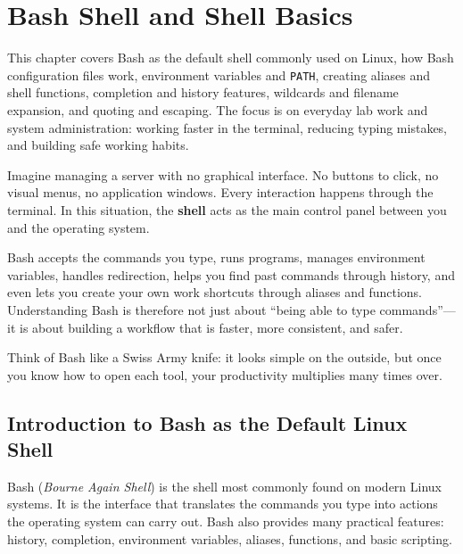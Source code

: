 
\chapter{Bash Shell and Shell Basics}
\label{ch:bash-shell-basic}

This chapter covers Bash as the default shell commonly used on Linux, how
Bash configuration files work, environment variables and \texttt{PATH},
creating aliases and shell functions, completion and history features,
wildcards and filename expansion, and quoting and escaping. The focus is on
everyday lab work and system administration: working faster in the terminal,
reducing typing mistakes, and building safe working habits.

\begin{examplebox}
Imagine managing a server with no graphical interface. No buttons to click,
no visual menus, no application windows. Every interaction happens through
the terminal. In this situation, the \textbf{shell} acts as the main control
panel between you and the operating system.

Bash accepts the commands you type, runs programs, manages environment
variables, handles redirection, helps you find past commands through history,
and even lets you create your own work shortcuts through aliases and
functions. Understanding Bash is therefore not just about ``being able to
type commands''---it is about building a workflow that is faster, more
consistent, and safer.

Think of Bash like a Swiss Army knife: it looks simple on the outside, but
once you know how to open each tool, your productivity multiplies many times
over.
\end{examplebox}

\section{Introduction to Bash as the Default Linux Shell}
\label{sec:bash-introduction}

Bash (\textit{Bourne Again Shell}) is the shell most commonly found on modern
Linux systems. It is the interface that translates the commands you type into
actions the operating system can carry out. Bash also provides many practical
features: history, completion, environment variables, aliases, functions, and
basic scripting.

